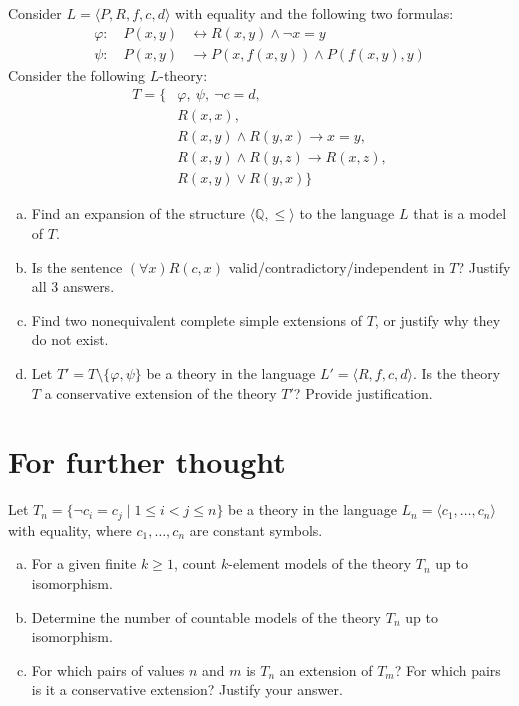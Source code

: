 \begin{problem}

    Consider $L=\langle P,R,f,c,d\rangle$ with equality and the following two formulas:
    \begin{align*}
        \varphi:\quad P(x,y) &\leftrightarrow R(x,y) \wedge \neg x=y\\
        \psi:\quad P(x,y) &\to P(x,f(x,y)) \wedge P(f(x,y),y)
    \end{align*}
    Consider the following $L$-theory:
    \begin{align*}
        T=\{&\varphi,\ \psi,\ \neg c=d,\\
        &R(x,x),\\ 
        &R(x,y) \wedge R(y,x) \to x=y,\\
        &R(x,y) \wedge R(y,z) \to R(x,z),\\
        &R(x,y) \vee R(y,x)\}    
    \end{align*}
    

    \begin{enumerate}[(a)]
        \item Find an expansion of the structure $\langle \mathbb{Q},\le \rangle$ to the language $L$ that is a model of $T$.
        \item Is the sentence $(\forall x)R(c,x)$ valid/contradictory/independent in $T$? Justify all 3 answers.
        \item Find two nonequivalent complete simple extensions of $T$, or justify why they do not exist.
        \item Let $T'=T\setminus\{\varphi,\psi\}$ be a theory in the language $L'=\langle R,f,c,d\rangle$. Is the theory $T$ a conservative extension of the theory $T'$? Provide justification.
    \end{enumerate}

\end{problem}

        
\section*{For further thought}


\begin{problem}

    Let $T_n = \{\neg c_i = c_j \mid 1 \leq i < j \leq n\}$ be a theory in the language $L_n = \langle c_1, \dots, c_n \rangle$ with equality, where $c_1, \dots, c_n$ are constant symbols.
    \begin{enumerate}[(a)]   
        \item For a given finite $k \geq 1$, count $k$-element models of the theory $T_n$ up to isomorphism. 
        \item Determine the number of countable models of the theory $T_n$ up to isomorphism. 
        \item For which pairs of values $n$ and $m$ is $T_n$ an extension of $T_m$? For which pairs is it a conservative extension? Justify your answer.
    \end{enumerate}

\end{problem}




